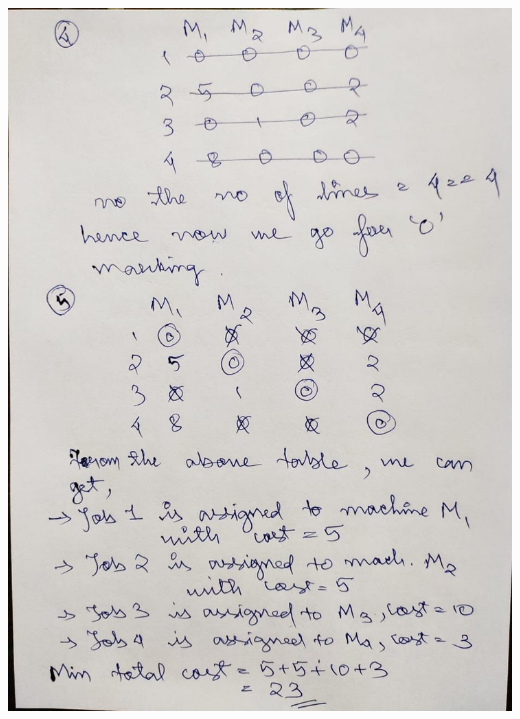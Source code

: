 \documentclass[12pt, letterpaper, twoside]{book}
\begin{document}
\includegraphics[width=\paperwidth, height=\paperheight]{Page11}
\end{document}
